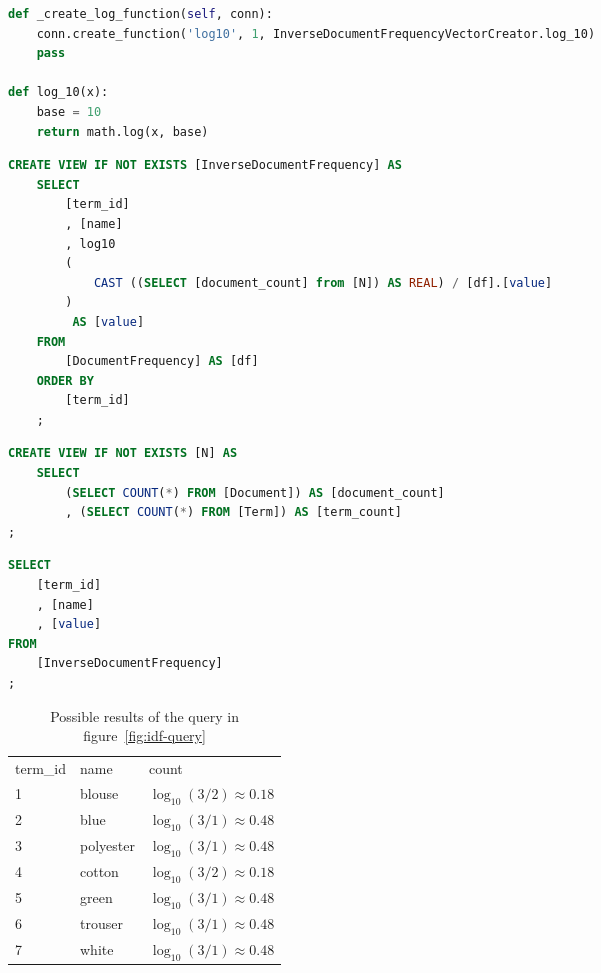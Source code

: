 \begin{lstlisting}[language=Python,caption={SQL-statement to create the InverseDocumentFrequency-view},label={lst:idf-view}]
def _create_log_function(self, conn):
    conn.create_function('log10', 1, InverseDocumentFrequencyVectorCreator.log_10)
    pass

def log_10(x):
    base = 10
    return math.log(x, base)
\end{lstlisting}
\begin{lstlisting}[language=SQL]
CREATE VIEW IF NOT EXISTS [InverseDocumentFrequency] AS
    SELECT
        [term_id]
        , [name]
        , log10
        (
            CAST ((SELECT [document_count] from [N]) AS REAL) / [df].[value]
        )
         AS [value]
    FROM
        [DocumentFrequency] AS [df]
    ORDER BY
        [term_id]
    ;
\end{lstlisting}


\begin{lstlisting}[language=SQL,caption={SQL-statement to create the N-view},label={lst:n-view},float=h]
CREATE VIEW IF NOT EXISTS [N] AS
    SELECT
        (SELECT COUNT(*) FROM [Document]) AS [document_count]
        , (SELECT COUNT(*) FROM [Term]) AS [term_count]
;
\end{lstlisting}


\begin{lstlisting}[language=SQL,caption={SQL-query for generating idf-vectors},label={fig:idf-query},float=h]
SELECT
    [term_id]
    , [name]
    , [value]
FROM
    [InverseDocumentFrequency]
;
\end{lstlisting}


\begin{table}
    \center
    \begin{tabular}{ l | l | l } 
        \rowcolor{\dustRowHead}
        \multicolumn{3}{ c }{\textbf{idf}}\\\hline
        term\_id    & name      & count\\\hline
        1           & blouse    & $\log_{10}(3/2) \approx 0.18$\\
        2           & blue      & $\log_{10}(3/1) \approx 0.48$\\
        3           & polyester & $\log_{10}(3/1) \approx 0.48$\\
        4           & cotton    & $\log_{10}(3/2) \approx 0.18$\\
        5           & green     & $\log_{10}(3/1) \approx 0.48$\\
        6           & trouser   & $\log_{10}(3/1) \approx 0.48$\\
        7           & white     & $\log_{10}(3/1) \approx 0.48$\\
    \end{tabular}
    \caption{Possible results of the query in figure~\ref{fig:idf-query}}
    \label{tab:idf-query-result}
\end{table}

